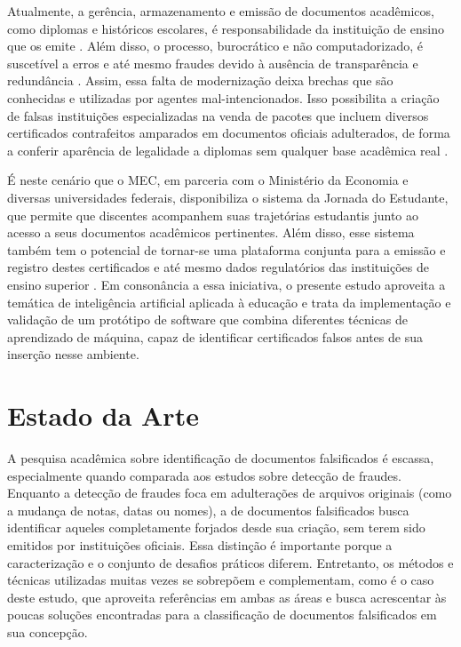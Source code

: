 \documentclass[12pt]{article}
\begin{document}
Atualmente, a gerência, armazenamento e emissão de documentos acadêmicos, como diplomas e históricos escolares, é responsabilidade da instituição de ensino que os emite \cite{mec:1978}. Além disso, o processo, burocrático e não computadorizado, é suscetível a erros e até mesmo fraudes devido à ausência de transparência e redundância \cite{palma:2019}. Assim, essa falta de modernização deixa brechas que são conhecidas e utilizadas por agentes mal-intencionados. Isso possibilita a criação de falsas instituições especializadas na venda de pacotes que incluem diversos certificados contrafeitos amparados em documentos oficiais adulterados, de forma a conferir aparência de legalidade a diplomas sem qualquer base acadêmica real \cite{dias:2022}.

É neste cenário que o MEC, em parceria com o Ministério da Economia e diversas universidades federais, disponibiliza o sistema da Jornada do Estudante, que permite que discentes acompanhem suas trajetórias estudantis junto ao acesso a seus documentos acadêmicos pertinentes. Além disso, esse sistema também tem o potencial de tornar-se uma plataforma conjunta para a emissão e registro destes certificados e até mesmo dados regulatórios das instituições de ensino superior \cite{rnp:2023}. Em consonância a essa iniciativa, o presente estudo aproveita a temática de inteligência artificial aplicada à educação e trata da implementação e validação de um protótipo de software que combina diferentes técnicas de aprendizado de máquina, capaz de identificar certificados falsos antes de sua inserção nesse ambiente.

\section{Estado da Arte}

A pesquisa acadêmica sobre identificação de documentos falsificados é escassa, especialmente quando comparada aos estudos sobre detecção de fraudes. Enquanto a detecção de fraudes foca em adulterações de arquivos originais (como a mudança de notas, datas ou nomes), a de documentos falsificados busca identificar aqueles completamente forjados desde sua criação, sem terem sido emitidos por instituições oficiais. Essa distinção é importante porque a caracterização e o conjunto de desafios práticos diferem. Entretanto, os métodos e técnicas utilizadas muitas vezes se sobrepõem e complementam, como é o caso deste estudo, que aproveita referências em ambas as áreas e busca acrescentar às poucas soluções encontradas para a classificação de documentos falsificados em sua concepção.
\end{document}
